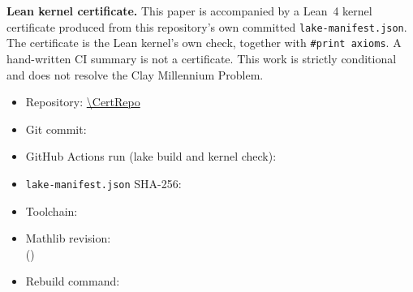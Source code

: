 \noindent\textbf{Lean kernel certificate.}
This paper is accompanied by a Lean~4 kernel certificate produced from this
repository's own committed \texttt{lake-manifest.json}.
The certificate is the Lean kernel's own check, together with
\texttt{\#print axioms}. A hand-written CI summary is not a certificate.
This work is strictly conditional and does not resolve the Clay Millennium Problem.
{\small\raggedright
\begin{itemize}
\item Repository: \url{\CertRepo}
\item Git commit:\\
\texttt{\CertCommit}
\item GitHub Actions run (lake build and kernel check):\\
\texttt{\CertRunId}
\item \texttt{lake-manifest.json} SHA-256:\\
\texttt{\CertManifestSha}
\item Toolchain: \texttt{\CertToolchain}
\item Mathlib revision:\\
\texttt{\CertMathlibRev} (\texttt{\CertMathlibInputRev})
\item Rebuild command:\\
\texttt{\CertRebuild}
\end{itemize}
\par}
